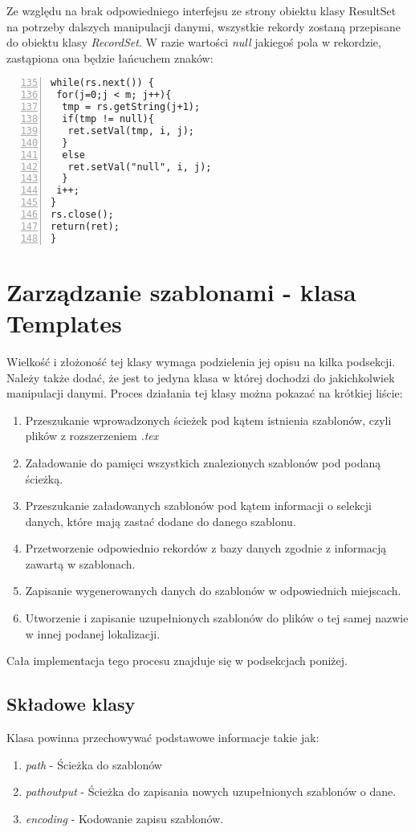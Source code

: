Ze względu na brak odpowiedniego interfejsu ze strony obiektu klasy ResultSet na potrzeby dalszych manipulacji danymi, wszystkie rekordy zostaną przepisane do obiektu klasy \emph{RecordSet}. W razie wartości  \emph{null} jakiegoś pola w rekordzie, zastąpiona ona będzie łańcuchem znaków:
\begin{lstlisting}[numbers=left,firstnumber=135]
while(rs.next()) {
 for(j=0;j < m; j++){
  tmp = rs.getString(j+1);
  if(tmp != null){
   ret.setVal(tmp, i, j);
  }
  else
   ret.setVal("null", i, j);
  }
 i++;
}   
rs.close();
return(ret);
}
\end{lstlisting}


\section{Zarządzanie szablonami - klasa Templates}

Wielkość i złożoność tej klasy wymaga podzielenia jej opisu na kilka podsekcji. Należy także dodać, że jest to jedyna klasa w której dochodzi do jakichkolwiek manipulacji danymi. Proces działania tej klasy można pokazać na krótkiej liście:
\vspace{5mm}
    \begin{enumerate}
    \item Przeszukanie wprowadzonych ścieżek pod kątem istnienia szablonów, czyli plików z rozszerzeniem \emph{.tex}
    \item Załadowanie do pamięci wszystkich znalezionych szablonów pod podaną ścieżką.
    \item Przeszukanie załadowanych szablonów pod kątem informacji o selekcji danych, które mają zastać dodane do danego szablonu.
    \item Przetworzenie odpowiednio rekordów z bazy danych zgodnie z informacją zawartą w szablonach.
    \item Zapisanie wygenerowanych danych do szablonów w odpowiednich miejscach.
    \item Utworzenie i zapisanie uzupełnionych szablonów do plików o tej samej nazwie w innej podanej lokalizacji.
     \end{enumerate}
\vspace{5mm}
Cała implementacja tego procesu znajduje się w podsekcjach poniżej. 
\subsection{Składowe klasy}

Klasa powinna przechowywać podstawowe informacje takie jak:
    \begin{enumerate}
    \item \emph{path} - Ścieżka do szablonów
    \item \emph{pathoutput}  - Ścieżka do zapisania nowych uzupełnionych szablonów o dane.
    \item \emph{encoding} - Kodowanie zapisu szablonów.
     \end{enumerate}

